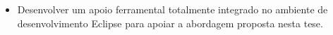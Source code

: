 \begin{itemize}
	
	
    \item Desenvolver um apoio ferramental totalmente integrado no ambiente de desenvolvimento Eclipse para apoiar a abordagem proposta nesta tese.

\end{itemize}






	
	
	
